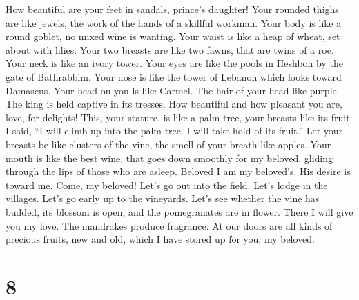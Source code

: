  How beautiful are your feet in sandals, prince's daughter!
Your rounded thighs are like jewels, the work of the hands of a skillful
workman.  Your body is like a round goblet, no mixed wine is
wanting. Your waist is like a heap of wheat, set about with lilies.
 Your two breasts are like two fawns, that are twins of a
roe.  Your neck is like an ivory tower. Your eyes are like
the pools in Heshbon by the gate of Bathrabbim. Your nose is like the
tower of Lebanon which looks toward Damascus.  Your head on
you is like Carmel. The hair of your head like purple. The king is held
captive in its tresses.  How beautiful and how pleasant you
are, love, for delights!  This, your stature, is like a palm
tree, your breasts like its fruit.  I said, ``I will climb
up into the palm tree. I will take hold of its fruit.'' Let your breasts
be like clusters of the vine, the smell of your breath like apples.
 Your mouth is like the best wine, that goes down smoothly
for my beloved, gliding through the lips of those who are asleep.
Beloved  I am my beloved's. His desire is toward me.
 Come, my beloved! Let's go out into the field. Let's lodge
in the villages.  Let's go early up to the vineyards. Let's
see whether the vine has budded, its blossom is open, and the
pomegranates are in flower. There I will give you my love. 
The mandrakes produce fragrance. At our doors are all kinds of precious
fruits, new and old, which I have stored up for you, my beloved.

\hypertarget{section-7}{%
\section{8}\label{section-7}}

